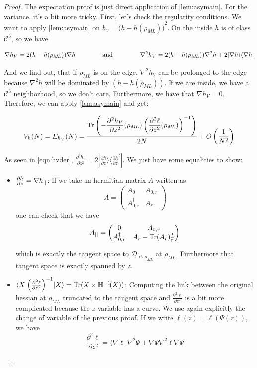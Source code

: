 \documentclass[10pt,a4paper]{report}
\theoremstyle{plain}
\theoremstyle{definition}
\theoremstyle{remark}
\newcommand{\ket}[1]{|#1\rangle}
\newcommand{\bra}[1]{\langle#1|}
\newcommand{\dpar}[2]{\frac{\partial{#1}}{\partial{#2}}}
\newcommand{\dparn}[3]{\frac{\partial^{#3} {#1}}{\partial{#2}^{#3}}}
\newcommand{\mat}[1]{\begin{pmatrix}#1\end{pmatrix}}
\DeclareMathOperator{\Tr}{Tr}
\DeclareMathOperator{\rk}{rk}
\newcommand{\class}[1]{{\mathscr{C}^{#1}}}
\newcommand{\ml}{_{M\!L}}
\newcommand{\gap}{\hspace{1.5cm}}
\begin{document}
\begin{proof}
  The expectation proof is just direct application of \cref{lem:asymain}. For
  the variance, it's a bit more tricky. First, let's check the regularity
  conditions. We want to apply \cref{lem:asymain} on $h_v = {\big(h - h(\rho\ml)\big)}^2$.
  On the inside $h$ is of class $\class 3$, so we have

  \begin{equation}\label{eqn:hvder}
  \nabla h_V = 2 (h - h(\rho\ml)) \nabla h \gap \text{and}\gap \nabla^2 h_V =
    2(h-h(\rho\ml)) \nabla^2 h
    + 2 \ket {\nabla h} \bra {\nabla h}
\end{equation}

  And we find out, that if $\rho\ml$ is on the edge,
  $\nabla^2 h_V$ can be prolonged to the edge because $\nabla^2 h$
  will be dominated by $(h - h(\rho\ml))$. If we are inside, we have a $\class 3$
  neighborhood, so we don't care. Furthermore, we have that $\nabla h_V = 0$.
  Therefore, we can apply \cref{lem:asymain} and get:

  \[V_h(N) = E_{h_V}(N) =
    \frac{\displaystyle \Tr \left( - \dparn {h_V} z 2 (\rho\ml)
        \left( \dparn \ell z 2(\rho\ml)\right)\inv\right)}
    {2N}
    + O\left(\frac 1 {N^2}\right)\]

  As seen in \cref{eqn:hvder}, $\dparn {h_v} z 2 = 2 \ket {\dpar h z} \bra{\dpar h z^t}$. We
  just have some equalities to show:

  \begin{itemize}
  \item $\dpar h z = \nabla h\pr$: If we take an hermitian matrix $A$ written as
    \[A = \mat{A_0& A_{0,r}\\A_{0,r}^\dagger & A_r}\]
    one can check that we have
    \[ A\pr = \mat{0&A_{0,r}\\A_{0,r}^\dagger & A_r - \Tr(A_r)\frac Ir}\]

    which is exactly the tangent space to $\mathcal{D}_{\rk \rho\ml}$ at $\rho\ml$. Furthermore
    that tangent space is exactly spanned by $z$.

    \item $\bra X {\left (\dparn \ell z 2\right)}^{-1}
      \ket X = \Tr(X\times \mathbb H\inv\!(X))$: Computing the link between the
      original hessian at $\rho\ml$ truncated to the tangent space and $\dparn
      \ell z 2$ is a bit more complicated because the $z$ variable has a curve. We
      use again explicitly the change of variable of the previous proof. If
      we write $\ell(z) = \ell(\Psi(z))$, we have
      \[ \dparn \ell z 2 = \bra{ \nabla \ell} \nabla^2 \Psi + \nabla \Psi
        \nabla^2 \ell \nabla \Psi\]


\end{itemize}
\end{proof}
\end{document}
